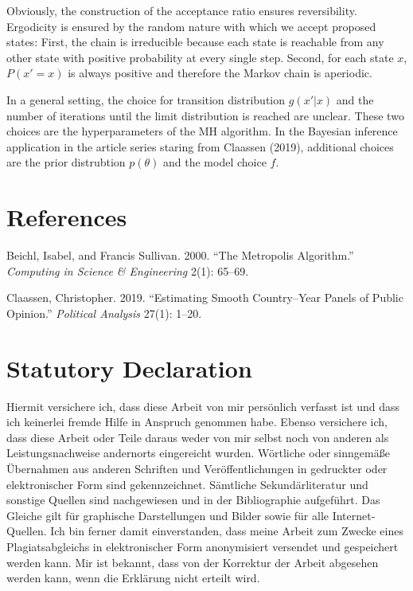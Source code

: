 \documentclass[12pt,english,a4paper,oneside]{article}
\newlength{\cslhangindent}
\newlength{\cslentryspacingunit} %
\newenvironment{CSLReferences}[2] %
 {%
  \setlength{\parindent}{0pt}
  \ifodd #1
  \let\oldpar\par
  \def\par{\hangindent=\cslhangindent\oldpar}
  \fi
  \setlength{\parskip}{#2\cslentryspacingunit}
 }%
 {}
\theoremstyle{definition}
\theoremstyle{definition}
\theoremstyle{definition}
\theoremstyle{definition}
\theoremstyle{remark}
\begin{document}
\noindent
Obviously, the construction of the acceptance ratio ensures reversibility. Ergodicity is ensured by the random nature with which we accept proposed states: First, the chain is irreducible because each state is reachable from any other state with positive probability at every single step. Second, for each state \(x\), \(P(x'=x)\) is always positive and therefore the Markov chain is aperiodic.

In a general setting, the choice for transition distribution \(g(x'|x)\) and the number of iterations until the limit distribution is reached are unclear. These two choices are the hyperparameters of the MH algorithm. In the Bayesian inference application in the article series staring from Claassen (2019), additional choices are the prior distrubtion \(p(\theta)\) and the model choice \(f\).

\newpage

\hypertarget{references}{%
\section*{References}\label{references}}

\singlespacing

\hypertarget{refs}{}
\begin{CSLReferences}{1}{0}
\leavevmode{}%
Beichl, Isabel, and Francis Sullivan. 2000. {``The Metropolis Algorithm.''} \emph{Computing in Science \& Engineering} 2(1): 65--69.

\leavevmode{}%
Claassen, Christopher. 2019. {``Estimating Smooth Country--Year Panels of Public Opinion.''} \emph{Political Analysis} 27(1): 1--20.

\end{CSLReferences}

\clearpage

\hypertarget{statutory-declaration}{%
\section*{Statutory Declaration}\label{statutory-declaration}}

Hiermit versichere ich, dass diese Arbeit von mir persönlich verfasst ist und dass ich keinerlei fremde Hilfe in Anspruch genommen habe.
Ebenso versichere ich, dass diese Arbeit oder Teile daraus weder von mir selbst noch von anderen als Leistungsnachweise andernorts eingereicht wurden.
Wörtliche oder sinngemäße Übernahmen aus anderen Schriften und Veröffentlichungen in gedruckter oder elektronischer Form sind gekennzeichnet.
Sämtliche Sekundärliteratur und sonstige Quellen sind nachgewiesen und in der Bibliographie aufgeführt.
Das Gleiche gilt für graphische Darstellungen und Bilder sowie für alle Internet-Quellen.
Ich bin ferner damit einverstanden, dass meine Arbeit zum Zwecke eines Plagiatsabgleichs in elektronischer Form anonymisiert versendet und gespeichert werden kann.
Mir ist bekannt, dass von der Korrektur der Arbeit abgesehen werden kann, wenn die Erklärung nicht erteilt wird.
\end{document}
